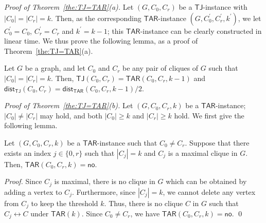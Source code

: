 \documentclass{llncs}
\newcommand{\onestep}{\leftrightarrow}
\newcommand{\TAR}[1]{\mathsf{TAR}(#1)}
\newcommand{\TJ}{\mathsf{TJ}}
\newcommand{\ini}{0}
\newcommand{\tar}{r}
\newcommand{\cliq}{C}
\newcommand{\TARrule}{\mathsf{TAR}}
\newcommand{\NO}{\mathsf{no}}
\newcommand{\TARins}[3]{\mathsf{TAR}(#1,#2,#3)}
\newcommand{\TJins}[2]{\mathsf{TJ}(#1,#2)}
\newcommand{\distTAR}[3]{\mathsf{dist_{TAR}}(#1,#2,#3)}
\newcommand{\distTJ}[2]{\mathsf{dist_{TJ}}(#1,#2)}
\newcounter{one}
\begin{document}
	\noindent
	{\em Proof of Theorem~{\rm \ref{the:TJ=TAR}(}a{\rm )}.}
	Let $(G, \cliq_{\ini}, \cliq_{\tar})$ be a $\TJ$-instance with $|\cliq_{\ini}| = |\cliq_{\tar}| = k$.
	Then, as the corresponding $\TARrule$-instance $(G, \cliq_{\ini}^\prime, \cliq_{\tar}^\prime, k^\prime)$, we let $\cliq_{\ini}^\prime = \cliq_{\ini}$, $\cliq_{\tar}^\prime = \cliq_{\tar}$ and $k^\prime = k-1$;
this $\TARrule$-instance can be clearly constructed in linear time.
	We thus prove the following lemma, as a proof of Theorem~\ref{the:TJ=TAR}(a).
	\begin{lemma} \label{lem:TJ->TAR}
	Let $G$ be a graph, and let $\cliq_{\ini}$ and $\cliq_{\tar}$ be any pair of cliques of $G$ such that $|\cliq_{\ini}| = |\cliq_{\tar}| = k$.
	Then, $\TJins{\cliq_{\ini}}{\cliq_{\tar}} = \TARins{\cliq_{\ini}}{\cliq_{\tar}}{k-1}$ and $\distTJ{\cliq_{\ini}}{\cliq_{\tar}} = \distTAR{\cliq_{\ini}}{\cliq_{\tar}}{k-1} /2$.
	\end{lemma}

	\noindent
	{\em Proof of Theorem~{\rm \ref{the:TJ=TAR}(}b{\rm )}.}
	Let $(G, \cliq_{\ini}, \cliq_{\tar}, k)$ be a $\TARrule$-instance; 
$|\cliq_{\ini}| \neq |\cliq_{\tar}|$ may hold, and both $|\cliq_{\ini}| \ge k$ and $|\cliq_{\tar}| \ge k$ hold.
	We first give the following lemma.
	\begin{lemma}
	Let $(G, \cliq_{\ini}, \cliq_{\tar}, k)$ be a $\TARrule$-instance such that $\cliq_{\ini} \neq \cliq_{\tar}$.
	Suppose that there exists an index $j \in \{\ini, \tar\}$ such that $|\cliq_j| =k$ and $\cliq_j$ is a maximal clique in $G$.
	Then, $\TARins{\cliq_{\ini}}{\cliq_{\tar}}{k} = \NO$. 
	\end{lemma}
	\begin{proof}
	Since $\cliq_j$ is maximal, there is no clique in $G$ which can be obtained by adding a vertex to $\cliq_j$. 
	Furthermore, since $|\cliq_j| = k$, we cannot delete any vertex from $\cliq_j$ to keep the threshold $k$. 
	Thus, there is no clique $C$ in $G$ such that $\cliq_j \onestep C$ under $\TAR{k}$.
	Since $\cliq_{\ini} \neq \cliq_{\tar}$, we have $\TARins{\cliq_{\ini}}{\cliq_{\tar}}{k} = \NO$. 
	\qed
	\end{proof}
\end{document}
